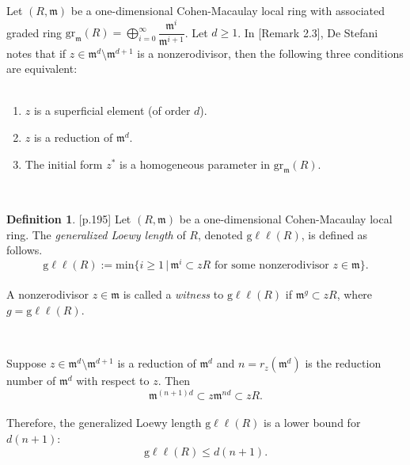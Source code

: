 \documentclass{amsart}
\theoremstyle{definition}
\theoremstyle{definition}
\newtheorem{definition}[theorem]{Definition}
\numberwithin{equation}{section}
\theoremstyle{definition}
\begin{document}
{Let $(R,\mathfrak{m})$ be a one-dimensional Cohen-Macaulay local ring with associated graded ring $\text{gr}_{\mathfrak{m}}(R)=\bigoplus\limits_{i=0}^{\infty}\dfrac{\mathfrak{m}^i}{\mathfrak{m}^{i+1}}$. Let $d \geq 1$. In \cite{De Stefani16}[Remark 2.3], De Stefani notes that if $z \in \mathfrak{m}^d \setminus \mathfrak{m}^{d+1}$ is a nonzerodivisor, then the following three conditions are equivalent: \\\\
\begin{enumerate}
\item[$(1)$] $z$ is a superficial element (of order $d$). \\
\item[$(2)$] $z$ is a reduction of $\mathfrak{m}^d$. \\
\item[$(3)$] The initial form $z^*$ is a homogeneous parameter in $\text{gr}_{\mathfrak{m}}(R)$.
\end{enumerate}\text{}\\
\begin{definition}\cite{LW12}[p.195]  Let $(R,\mathfrak{m})$ be a one-dimensional Cohen-Macaulay local ring. The {\it{generalized Loewy length}} of $R$, denoted $\text{g}\ell\ell(R)$, is defined as follows.\\
\[
\text{g}\ell\ell(R):=\text{min}\{i \geq 1\,|\,\mathfrak{m}^i \subset zR \,\,\text{for some nonzerodivisor}\,\, z \in \mathfrak{m}\}.
\]\text{}\\
A nonzerodivisor $z \in \mathfrak{m}$ is called a {\it{witness}} to $\text{g}\ell\ell(R)$ if $\mathfrak{m}^g \subset zR$, where $g=\text{g}\ell\ell(R)$.
\end{definition}
\text{}\\ \text{}

Suppose $z \in \mathfrak{m}^d \setminus \mathfrak{m}^{d+1}$ is a reduction of $\mathfrak{m}^d$ and $n=r_{z}(\mathfrak{m}^d)$ is the reduction number of $\mathfrak{m}^d$ with respect to $z$. Then 
\begin{equation*}
\mathfrak{m}^{(n+1)d} \subset z\mathfrak{m}^{nd} \subset zR.
\end{equation*}\text{}\\ 
Therefore, the generalized Loewy length $\text{g}\ell\ell(R)$ is a lower bound for $d(n+1)$:\\
\begin{equation*}
\text{g}\ell\ell(R) \leq d(n+1).
\end{equation*}\text{}

}
\end{document}
